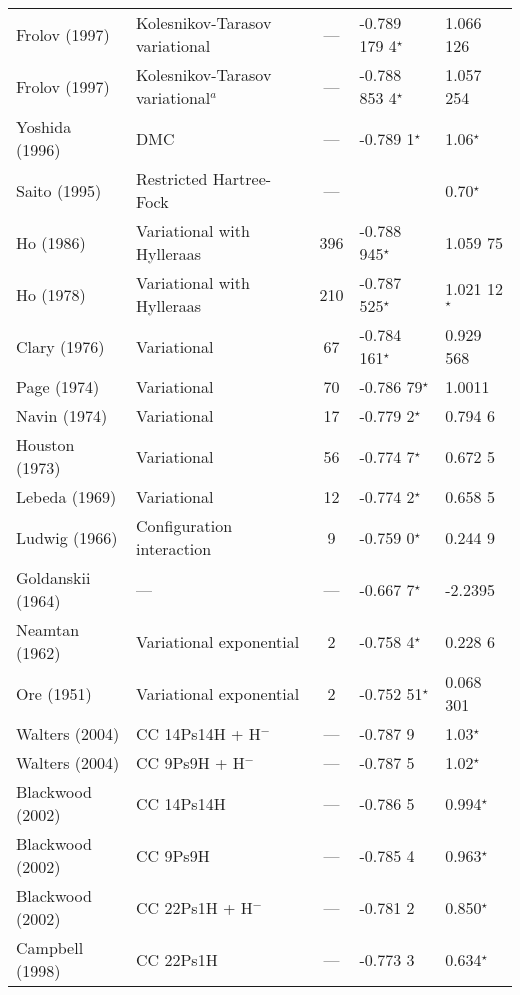 \documentclass[Dissertation.tex]{subfiles}
\begin{document}
\begin{center}
\begin{longtable}{l l c l l}
Frolov (1997) \cite{Frolov1997c} & Kolesnikov-Tarasov variational & --- & -0.789 179 4$^\star$ & 1.066 126 \\
Frolov (1997) \cite{Frolov1997c} & Kolesnikov-Tarasov variational$^a$ & --- & -0.788 853 4$^\star$ & 1.057 254 \\
Yoshida (1996) \cite{Yoshida1996} & DMC & --- & -0.789 1$^\star$ & 1.06$^\star$ \\
Saito (1995) \cite{Saito1995} & Restricted Hartree-Fock & --- &  & 0.70$^\star$ \\
Ho (1986) \cite{Ho1986} & Variational with Hylleraas & 396 & -0.788 945$^\star$ & 1.059 75 \\
Ho (1978) \cite{Ho1978} & Variational with Hylleraas & 210 & -0.787 525$^\star$ & 1.021 12$^\star$ \\
Clary (1976) \cite{Clary1976} & Variational & 67 & -0.784 161$^\star$ & 0.929 568 \\
Page (1974) \cite{Page1974} & Variational & 70 & -0.786 79$^\star$ & 1.0011 \\
Navin (1974) \cite{Navin1974} & Variational & 17 & -0.779 2$^\star$ & 0.794 6 \\
Houston (1973) \cite{Houston1973} & Variational & 56 & -0.774 7$^\star$ & 0.672 5 \\
Lebeda (1969) \cite{Lebeda1969} & Variational & 12 & -0.774 2$^\star$ & 0.658 5 \\
Ludwig (1966) \cite{Ludwig1966} & Configuration interaction & 9 & -0.759 0$^\star$ & 0.244 9 \\
Goldanskii (1964) \cite{Clary1976} & --- & --- & -0.667 7$^\star$ & -2.2395 \\
Neamtan (1962) \cite{Neamtan1962} & Variational exponential & 2 & -0.758 4$^\star$ & 0.228 6 \\*
Ore (1951) \cite{Ore1951} & Variational exponential & 2 & -0.752 51$^\star$ & 0.068 301 \\*
Walters (2004) \cite{Walters2004} & CC 14Ps14H + H$^-$ & --- & -0.787 9 & 1.03$^\star$\\*
Walters (2004) \cite{Walters2004} & CC 9Ps9H + H$^-$ & --- & -0.787 5 & 1.02$^\star$\\*
Blackwood (2002) \cite{Blackwood2002} & CC 14Ps14H & --- & -0.786 5  & 0.994$^\star$ \\*
Blackwood (2002) \cite{Blackwood2002} & CC 9Ps9H & --- & -0.785 4 & 0.963$^\star$ \\*
Blackwood (2002) \cite{Blackwood2002b} & CC 22Ps1H + H$^-$ & --- & -0.781 2 & 0.850$^\star$ \\*
Campbell (1998) \cite{Campbell1998} & CC 22Ps1H & --- & -0.773 3 & 0.634$^\star$ \\*
\bottomrule
\end{longtable}
\end{center}
\end{document}
